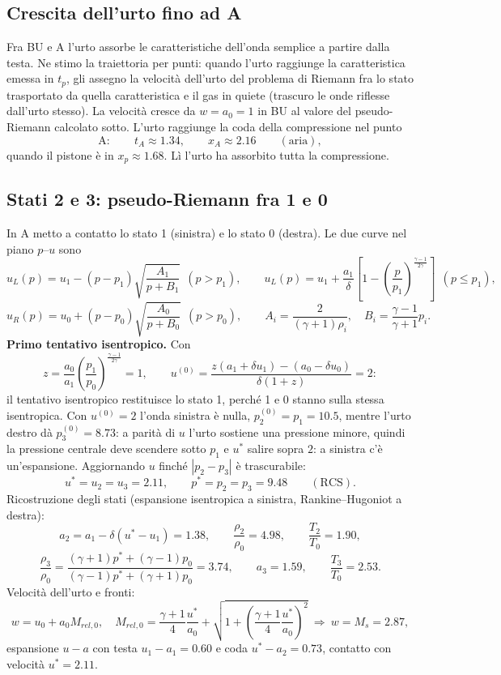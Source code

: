 \documentclass[11pt,a4paper]{article}
\newcommand{\uma}{u-a}
\newcommand{\Ms}{M_{s}}
\begin{document}
\subsection*{Crescita dell'urto fino ad A}
Fra BU e A l'urto assorbe le caratteristiche dell'onda semplice a partire dalla testa. Ne stimo la traiettoria per
punti: quando l'urto raggiunge la caratteristica emessa in $t_p$, gli assegno la velocità dell'urto del problema di
Riemann fra lo stato trasportato da quella caratteristica e il gas in quiete (trascuro le onde riflesse dall'urto
stesso). La velocità cresce da $w=a_0=1$ in BU al valore del pseudo-Riemann calcolato sotto. L'urto raggiunge la
coda della compressione nel punto
\[
\text{A}:\qquad t_A\approx\num{1.34},\qquad x_A\approx\num{2.16}\qquad(\text{aria}),
\]
quando il pistone è in $x_p\approx\num{1.68}$. Lì l'urto ha assorbito tutta la compressione.

\subsection*{Stati 2 e 3: pseudo-Riemann fra 1 e 0}
In A metto a contatto lo stato 1 (sinistra) e lo stato 0 (destra). Le due curve nel piano $p$--$u$ sono
\[
u_L(p)=u_1-(p-p_1)\sqrt{\frac{A_1}{p+B_1}}\ \ (p>p_1),\qquad
u_L(p)=u_1+\frac{a_1}{\delta}\left[1-\left(\frac{p}{p_1}\right)^{\frac{\gamma-1}{2\gamma}}\right]\ \ (p\le p_1),
\]
\[
u_R(p)=u_0+(p-p_0)\sqrt{\frac{A_0}{p+B_0}}\ \ (p>p_0),\qquad A_i=\frac{2}{(\gamma+1)\rho_i},\quad
B_i=\frac{\gamma-1}{\gamma+1}p_i.
\]
\textbf{Primo tentativo isentropico.} Con
\[
z=\frac{a_0}{a_1}\left(\frac{p_1}{p_0}\right)^{\frac{\gamma-1}{2\gamma}}=1,\qquad
u^{(0)}=\frac{z(a_1+\delta u_1)-(a_0-\delta u_0)}{\delta(1+z)}=2:
\]
il tentativo isentropico restituisce lo stato 1, perché 1 e 0 stanno sulla stessa isentropica. Con $u^{(0)}=2$
l'onda sinistra è nulla, $p_2^{(0)}=p_1=\num{10.5}$, mentre l'urto destro dà $p_3^{(0)}=\num{8.73}$: a parità di $u$
l'urto sostiene una pressione minore, quindi la pressione centrale deve scendere sotto $p_1$ e $u^*$ salire sopra
$2$: a sinistra c'è un'espansione. Aggiornando $u$ finché $|p_2-p_3|$ è trascurabile:
\[
u^*=u_2=u_3=\num{2.11},\qquad p^*=p_2=p_3=\num{9.48}\qquad(\text{RCS}).
\]
Ricostruzione degli stati (espansione isentropica a sinistra, Rankine--Hugoniot a destra):
\[
a_2=a_1-\delta(u^*-u_1)=\num{1.38},\qquad \frac{\rho_2}{\rho_0}=\num{4.98},\qquad \frac{T_2}{T_0}=\num{1.90},
\]
\[
\frac{\rho_3}{\rho_0}=\frac{(\gamma+1)p^*+(\gamma-1)p_0}{(\gamma-1)p^*+(\gamma+1)p_0}=\num{3.74},\qquad
a_3=\num{1.59},\qquad \frac{T_3}{T_0}=\num{2.53}.
\]
Velocità dell'urto e fronti:
\[
w=u_0+a_0M_{rel,0},\quad
M_{rel,0}=\frac{\gamma+1}{4}\frac{u^*}{a_0}+\sqrt{1+\left(\frac{\gamma+1}{4}\frac{u^*}{a_0}\right)^2}
\ \Rightarrow\ w=\Ms=\num{2.87},
\]
espansione $\uma$ con testa $u_1-a_1=\num{0.60}$ e coda $u^*-a_2=\num{0.73}$, contatto con velocità $u^*=\num{2.11}$.
\end{document}

